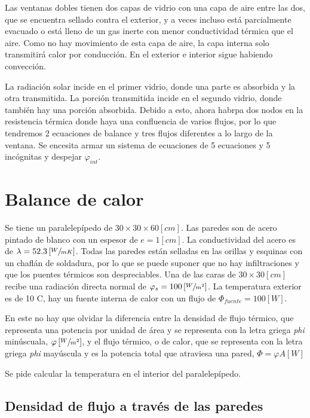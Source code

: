 \documentclass[12pt]{article}
\begin{document}
Las ventanas dobles tienen dos capas de vidrio con una capa de aire entre las dos, que se encuentra sellado contra el exterior, y a veces incluso está parcialmente evacuado o está lleno de un gas inerte con menor conductividad térmica que el aire. Como no hay movimiento de esta capa de aire, la capa interna solo transmitirá calor por conducción. En el exterior e interior sigue habiendo convección.

La radiación solar incide en el primer vidrio, donde una parte es absorbida y la otra transmitida. La porción transmitida incide en el segundo vidrio, donde también hay una porción absorbida. Debido a esto, ahora habrpa dos nodos en la resistencia térmica donde haya una confluencia de varios flujos, por lo que tendremos 2 ecuaciones de balance y tres flujos diferentes a lo largo de la ventana. Se encesita armar un sistema de ecuaciones de 5 ecuaciones y 5 incógnitas y despejar $ \varphi _{ int } $.


\section{Balance de calor}

Se tiene un paralelepípedo de $ 30 \times 30 \times 60 \left[ cm \right] $. Las paredes son de acero pintado de blanco con un espesor de $ e = 1 \left[ cm \right] $. La conductividad del acero es de $ \lambda = 52.3 \left[ \sfrac{ W }{ m K } \right] $. Todas las paredes están selladas en las orillas y esquinas con un chaflán de soldadura, por lo que se puede suponer que no hay infiltraciones y que los puentes térmicos son despreciables. Una de las caras de $ 30 \times 30 \left[ cm \right] $ recibe una radiación directa normal de $ \varphi _s = 100 \left[ \sfrac{ W }{ m ^2 } \right] $. La temperatura exterior es de 10 \degree C, hay un fuente interna de calor con un flujo de $ \Phi _{ fuente } = 100 \left[ W \right] $.

En este no hay que olvidar la diferencia entre la densidad de flujo térmico, que representa una potencia por unidad de área y se representa con la letra griega \emph{phi} minúscuala, $ \varphi \left[ \sfrac{ W }{ m ^2 } \right] $, y el flujo térmico, o de calor, que se representa con la letra griega \emph{phi} mayúscula y es la potencia total que atraviesa una pared, $ \Phi = \varphi A \left[ W \right] $

Se pide calcular la temperatura en el interior del paralelepípedo.

\subsection{Densidad de flujo a través de las paredes}
\end{document}
